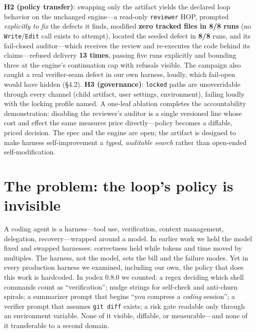 \documentclass[10pt]{article}
\begin{document}
\begin{center}
\begin{minipage}{0.92\textwidth}
\textbf{H2 (policy transfer)}: swapping only the artifact yields the declared loop behavior on the
unchanged engine---a read-only \texttt{reviewer} HOP, prompted \emph{explicitly to fix} the defects it
finds, modified \textbf{zero tracked files in 8/8 runs} (no \texttt{Write}/\texttt{Edit} call exists to
attempt), located the seeded defect in \textbf{8/8} runs, and its fail-closed auditor---which receives
the review and re-executes the code behind its claims---refused delivery \textbf{13 times}, passing
five runs explicitly and bounding three at the engine's continuation cap with refusals visible.
The campaign also caught a real verifier-seam defect in our own harness, loudly, which fail-open
would have hidden (\S4.2). \textbf{H3 (governance)}:
\texttt{locked} paths are unoverridable through every channel (child artifact, user settings,
environment), failing loudly with the locking profile named. A one-leaf ablation completes the
accountability demonstration: disabling the reviewer's auditor is a single versioned line whose cost
and effect the same measures price directly---policy becomes a diffable, priced decision. The spec and
the engine are open; the artifact is designed to make harness self-improvement a \emph{typed,
auditable search} rather than open-ended self-modification.
\end{minipage}
\end{center}

\section{The problem: the loop's policy is invisible}

A coding agent is a harness---tool use, verification, context management, delegation, recovery---wrapped
around a model. In earlier work we held the model fixed and swapped harnesses: correctness held while
tokens and time moved by multiples. The harness, not the model, sets the bill and the failure modes.
Yet in every production harness we examined, including our own, the policy that does this work is
hardcoded. In yodex 0.8.0 we counted: a regex deciding which shell commands count as ``verification'';
nudge strings for self-check and anti-churn spirals; a summarizer prompt that begins ``you compress a
\emph{coding} session''; a verifier prompt that assumes \texttt{git diff} exists; a risk gate readable
only through an environment variable. None of it visible, diffable, or measurable---and none of it
transferable to a second domain.
\end{document}

